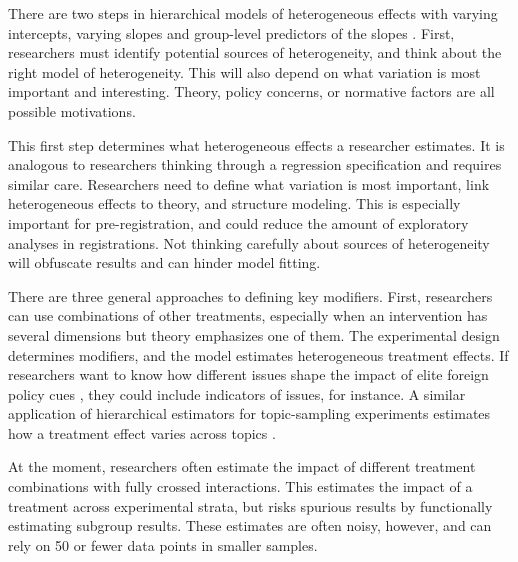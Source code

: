 \documentclass[12pt]{article}
\begin{document}
There are two steps in hierarchical models of heterogeneous effects with varying intercepts, varying slopes and group-level predictors of the slopes \citep{GelmanHill2007}.
First, researchers must identify potential sources of heterogeneity, and think about the right model of heterogeneity.
This will also depend on what variation is most important and interesting. 
Theory, policy concerns, or normative factors are all possible motivations. 


This first step determines what heterogeneous effects a researcher estimates. 
It is analogous to researchers thinking through a regression specification and requires similar care. 
Researchers need to define what variation is most important, link heterogeneous effects to theory, and structure modeling.
This is especially important for pre-registration, and could reduce the amount of exploratory analyses in registrations.
Not thinking carefully about sources of heterogeneity will obfuscate results and can hinder model fitting.
   

There are three general approaches to defining key modifiers.  
First, researchers can use combinations of other treatments, especially when an intervention has several dimensions but theory emphasizes one of them. 
The experimental design determines modifiers, and the model estimates heterogeneous treatment effects.   
If researchers want to know how different issues shape the impact of elite foreign policy cues \citep{GuisingerSaunders2017}, they could include indicators of issues, for instance.
A similar application of hierarchical estimators for topic-sampling experiments estimates how a treatment effect varies across topics \citep{CliffordRainey2024}. 


At the moment, researchers often estimate the impact of different treatment combinations with fully crossed interactions.
This estimates the impact of a treatment across experimental strata, but risks spurious results by functionally estimating subgroup results.
These estimates are often noisy, however, and can rely on 50 or fewer data points in smaller samples.
\end{document}
